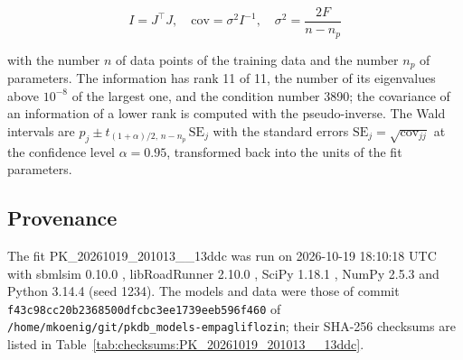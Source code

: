 \begin{equation}
I = J^\top J, \quad \mathrm{cov} = \sigma^2 I^{-1}, \quad \sigma^2 = \frac{2 F}{n - n_p}
\end{equation}

with the number $n$ of data points of the training data and the number $n_p$ of parameters. The information has rank 11 of 11, the number of its eigenvalues above $10^{-8}$ of the largest one, and the condition number 3890; the covariance of an information of a lower rank is computed with the pseudo-inverse. The Wald intervals are $\hat{p}_j \pm t_{(1+\alpha)/2,\, n-n_p}\, \mathrm{SE}_j$ with the standard errors $\mathrm{SE}_j = \sqrt{\mathrm{cov}_{jj}}$ at the confidence level $\alpha = 0.95$, transformed back into the units of the fit parameters.

\subsection{Provenance}

The fit PK\_20261019\_201013\_\_13ddc was run on 2026-10-19 18:10:18 UTC with sbmlsim 0.10.0 \cite{Koenig2026_sbmlsim}, libRoadRunner 2.10.0 \cite{Welsh2023}, SciPy 1.18.1 \cite{Virtanen2020}, NumPy 2.5.3 \cite{Harris2020} and Python 3.14.4 (seed 1234). The models and data were those of commit \texttt{f43c98cc20b2368500dfcbc3ee1739eeb596f460} of \texttt{/home/mkoenig/git/pkdb\_models-empagliflozin}; their SHA-256 checksums are listed in Table~\ref{tab:checksums:PK_20261019_201013__13ddc}.

